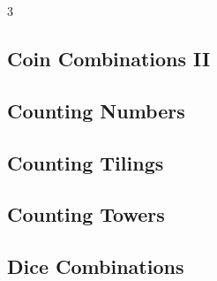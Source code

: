 \documentclass[8pt]{extarticle}
\begin{document}
\begin{multicols*}{3}
\subsection{Coin Combinations II}
\begin{caixaenunciado}

\end{caixaenunciado}
\vspace{0.3cm}


\subsection{Counting Numbers}
\begin{caixaenunciado}

\end{caixaenunciado}
\vspace{0.3cm}


\subsection{Counting Tilings}
\begin{caixaenunciado}

\end{caixaenunciado}
\vspace{0.3cm}


\subsection{Counting Towers}
\begin{caixaenunciado}

\end{caixaenunciado}
\vspace{0.3cm}


\subsection{Dice Combinations}
\begin{caixaenunciado}

\end{caixaenunciado}
\vspace{0.3cm}



\end{multicols*}
\end{document}
